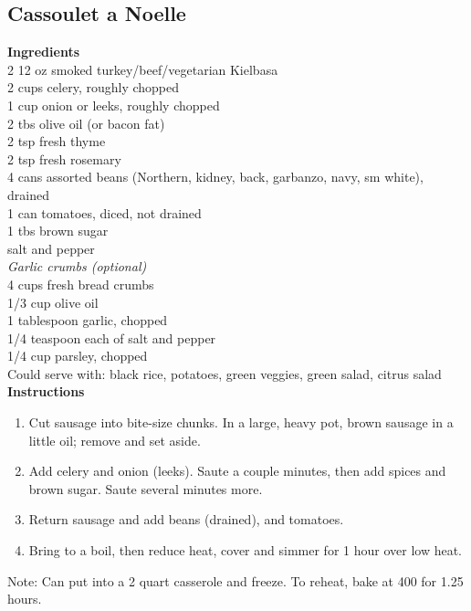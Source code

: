 \documentclass{article}
\numberwithin{figure}{section}
\numberwithin{equation}{section}
\begin{document}
\subsection{Cassoulet a Noelle}
{\bf Ingredients}\\
2 12 oz smoked turkey/beef/vegetarian Kielbasa\\
2 cups celery, roughly chopped\\
1 cup onion or leeks, roughly chopped\\
2 tbs olive oil (or bacon fat)\\
2 tsp fresh thyme\\
2 tsp fresh rosemary\\
4 cans assorted beans (Northern, kidney, back, garbanzo, navy, sm white), drained\\
1 can tomatoes, diced, not drained\\
1 tbs brown sugar\\
salt and pepper\\

{\it Garlic crumbs (optional)}\\
4 cups fresh bread crumbs\\
1/3 cup olive oil\\
1 tablespoon garlic, chopped\\
1/4 teaspoon each of salt and pepper\\

1/4 cup parsley, chopped\\

Could serve with: black rice, potatoes, green veggies, green salad, citrus salad\\

{\bf Instructions}
\begin{enumerate}
\item Cut sausage into bite-size chunks. In a large, heavy pot, brown sausage in a little oil; remove and set aside.
\item Add celery and onion (leeks).  Saute a couple minutes, then add spices and brown sugar.  Saute several minutes more.
\item Return sausage and add beans (drained), and tomatoes.
\item Bring to a boil, then reduce heat, cover and simmer for 1 hour over low heat.
\end{enumerate}

Note:  Can put into a 2 quart casserole and freeze.  To reheat, bake at 400 for 1.25 hours.\\
\end{document}
